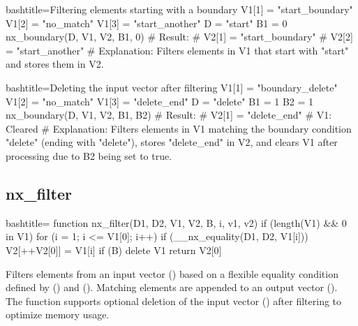 \begin{NexCodeBox}{bash}{title={Filtering elements starting with a boundary}}
	V1[1] = "start_boundary"
	V1[2] = "no_match"
	V1[3] = "start_another"
	D = "start"
	B1 = 0
	nx_boundary(D, V1, V2, B1, 0)
	# Result:
	# V2[1] = "start_boundary"
	# V2[2] = "start_another"
	# Explanation: Filters elements in V1 that start with "start" and stores them in V2.
\end{NexCodeBox}

\begin{NexCodeBox}{bash}{title={Deleting the input vector after filtering}}
	V1[1] = "boundary_delete"
	V1[2] = "no_match"
	V1[3] = "delete_end"
	D = "delete"
	B1 = 1
	B2 = 1
	nx_boundary(D, V1, V2, B1, B2)
	# Result:
	# V2[1] = "delete_end"
	# V1: Cleared
	# Explanation: Filters elements in V1 matching the boundary condition "delete" (ending with "delete"), stores "delete_end" in V2, and clears V1 after processing due to B2 being set to true.
\end{NexCodeBox}

\newpage
\subsection{nx_filter}
\label{nx_filter}
\begin{NexCodeBox}{bash}{title={}}
function nx_filter(D1, D2, V1, V2, B,   i, v1, v2)
{
	if (length(V1) && 0 in V1) {
		for (i = 1; i <= V1[0]; i++) {
			if (__nx_equality(D1, D2, V1[i]))
				V2[++V2[0]] = V1[i]
		}
		if (B)
			delete V1
		return V2[0]
	}
}
\end{NexCodeBox}

\begin{NexMainBox}
	\begin{NexMainBox}
		Filters elements from an input vector () based on a flexible equality condition defined by () and (). Matching elements are appended to an output vector (). The function supports optional deletion of the input vector () after filtering to optimize memory usage.
	\end{NexMainBox}
	\begin{NexMainBox}
		\begin{NexListDark}
		\end{NexListDark}
	\end{NexMainBox}
\end{NexMainBox}

